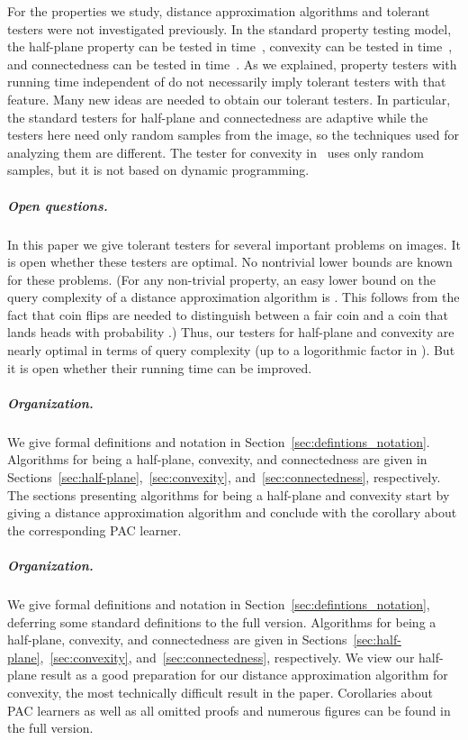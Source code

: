 \documentclass[11pt,english]{article}
\numberwithin{figure}{section}
\begin{document}
For the properties we study, distance approximation algorithms and tolerant testers were not investigated previously. In the standard property testing model, the half-plane property can be tested in  time~\cite{Ras03}, convexity can be tested in  time~\cite{BMR16socg}, and connectedness can be tested in  time~\cite{Ras03,BermanRY14}. As we explained, property testers with running time independent of  do not necessarily imply tolerant testers with that feature.
Many new ideas are needed to obtain our tolerant testers. In particular, the standard testers for half-plane and connectedness are adaptive while the testers here need only random samples from the image, so the techniques used for analyzing them are different. The tester for convexity in~\cite{BMR16socg} uses only random samples, but it is not based on dynamic programming.




\subparagraph{Open questions.}
In this paper we give tolerant testers for several important problems on images.
It is open whether these testers are optimal. No nontrivial lower bounds are known for these problems. (For any non-trivial property, an easy lower bound on the query complexity of a distance approximation algorithm is . This follows from the fact that  coin flips are needed to distinguish between a fair coin and a coin that lands heads with probability .) Thus, our testers for half-plane and convexity are nearly optimal in terms of query complexity (up to a logorithmic factor in ). But it is open whether their running time can be improved.


\ifnum{}
\subparagraph{Organization.} We give formal definitions and notation in Section~\ref{sec:defintions_notation}. Algorithms for being a half-plane, convexity, and connectedness are given in Sections~\ref{sec:half-plane},~\ref{sec:convexity}, and~\ref{sec:connectedness}, respectively. The sections presenting algorithms for being a half-plane and convexity start by giving a distance approximation algorithm and conclude with the corollary about the corresponding PAC learner.
\else
\subparagraph{Organization.} We give formal definitions and notation in Section~\ref{sec:defintions_notation}, deferring some standard definitions to the {\color{black} full version}. Algorithms for being a half-plane, convexity, and connectedness are given in Sections~\ref{sec:half-plane},~\ref{sec:convexity}, and~\ref{sec:connectedness}, respectively.  We view our half-plane result as a good preparation for our distance approximation algorithm for convexity, the most technically difficult result in the paper. Corollaries about PAC learners as well as all omitted proofs and numerous figures can be found in the {\color{black} full version}.
\fi
\end{document}

